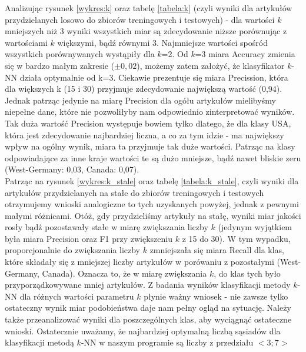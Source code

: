 \documentclass{classrep}
\begin{document}
Analizując rysunek \ref{wykres:k} oraz tabelę \ref{tabela:k} (czyli wyniki dla artykułów przydzielanych losowo do zbiorów treningowych i testowych) - dla wartości $k$ mniejszych niż 3 wyniki wszystkich miar są zdecydowanie niższe porównując z wartościami $k$ większymi, bądź równymi 3. Najmniejsze wartości spośród wszystkich porównywanych wystąpiły dla $k$=2. Od $k$=3 miara Accuracy zmienia się w bardzo małym zakresie ($\pm 0,02$), możemy zatem założyć, że klasyfikator $k$-NN działa optymalnie od k=3. Ciekawie prezentuje się miara Precission, która dla większych k (15 i 30) przyjmuje zdecydowanie największą wartość (0,94). Jednak patrząc jedynie na miarę Precision dla ogółu artykułów mielibyśmy niepełne dane, które nie pozwoliłyby nam odpowiednio zinterpretować wyników. Tak duża wartość Precision występuje bowiem tylko dlatego, że dla klasy USA, która jest zdecydowanie najbardziej liczna, a co za tym idzie - ma największy wpływ na ogólny wynik, miara ta przyjmuje tak duże wartości. Patrząc na klasy odpowiadające za inne kraje wartości te są dużo mniejsze, bądź nawet bliskie zeru (West-Germany: 0,03, Canada: 0,07).\\
\indent Patrząc na rysunek \ref{wykres:k_stale} oraz tabelę \ref{tabela:k_stale}, czyli wyniki dla artykułów przydzielanych na stałe do zbiorów treningowych i testowych otrzymujemy wnioski analogiczne to tych uzyskanych powyżej, jednak z pewnymi małymi różnicami. Otóż, gdy przydzieliśmy artykuły na stałę, wyniki miar jakości rosły bądź pozostawały stałe w miarę zwiększania liczby $k$ (jedynym wyjątkiem była miara Precision oraz F1 przy zwiększeniu $k$ z 15 do 30). W tym wypadku, proporcjonalnie do zwiększania liczby $k$ zmniejszała się miara Recall dla klas, które składały się z mniejszej liczby artykułów w porówaniu z pozostałymi (West-Germany, Canada). Oznacza to, że w miarę zwiększania $k$, do klas tych było przyporządkowywane mniej artykułów. Z badania wyników klasyfikacji metody $k$-NN dla różnych wartości parametru $k$ płynie ważny wniosek - nie zawsze tylko ostateczny wynik miar podobieństwa daje nam pełny ogląd na sytuację. Należy także przeanalizować wyniki dla poszczególnych klas, aby wyciągnąć ostateczne wnioski. Ostatecznie uważamy, że najbardziej optymalną liczbą sąsiadów dla klasyfikacji metodą $k$-NN w naszym programie są liczby z przedziału $<3;7>$ 
\end{document}
